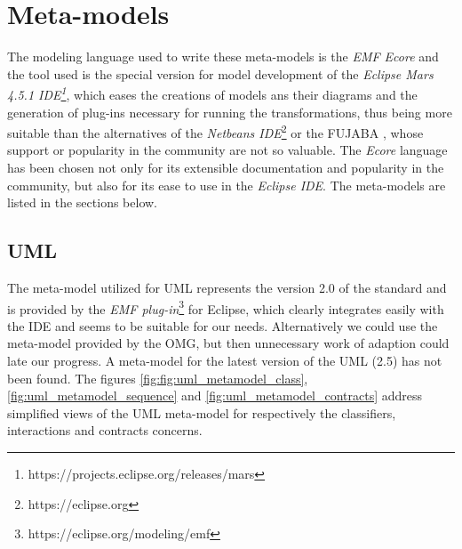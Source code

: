 \documentclass[tuberlin,cic,tc,english,noabntcite]{iiufrgs}
\begin{document}
\section{Meta-models}
The modeling language used to write these meta-models is the \emph{EMF Ecore} and the tool used is the special version for model development of the \emph{Eclipse Mars 4.5.1 IDE\footnote{https://projects.eclipse.org/releases/mars}}, which eases the creations of models ans their diagrams and the generation of plug-ins necessary for running the transformations, thus being more suitable than the alternatives of the \emph{Netbeans IDE}\footnote{https://eclipse.org} or the FUJABA \citep{nickel2000fujaba}, whose support or popularity in the community are not so valuable. The \emph{Ecore} language has been chosen not only for its extensible documentation and popularity in the community, but also for its ease to use in the \emph{Eclipse IDE}. The meta-models are listed in the sections below.

\subsection{UML}
The meta-model utilized for UML represents the version 2.0 of the standard and is provided by the \emph{EMF plug-in}\footnote{https://eclipse.org/modeling/emf} for Eclipse, which clearly integrates easily with the IDE and seems to be suitable for our needs. Alternatively we could use the meta-model provided by the OMG, but then unnecessary work of adaption could late our progress. A meta-model for the latest version of the UML (2.5) has not been found. The figures \ref{fig:fig:uml_metamodel_class}, \ref{fig:uml_metamodel_sequence} and \ref{fig:uml_metamodel_contracts} address simplified views of the UML meta-model for respectively the classifiers, interactions and contracts concerns.
\end{document}
